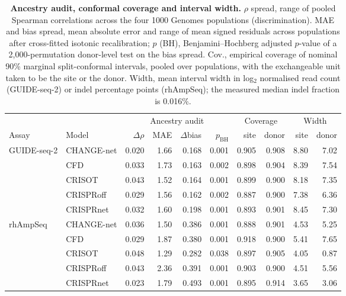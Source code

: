 \begin{table}[htbp]
\centering
\caption{\textbf{Ancestry audit, conformal coverage and interval width.} $\rho$ spread, range of pooled Spearman correlations across the four 1000 Genomes populations (discrimination). MAE and bias spread, mean absolute error and range of mean signed residuals across populations after cross-fitted isotonic recalibration; $p$ (BH), Benjamini--Hochberg adjusted $p$-value of a 2{,}000-permutation donor-level test on the bias spread. Cov., empirical coverage of nominal 90\% marginal split-conformal intervals, pooled over populations, with the exchangeable unit taken to be the site or the donor. Width, mean interval width in log$_2$ normalised read count (GUIDE-seq-2) or indel percentage points (rhAmpSeq); the measured median indel fraction is 0.016\%.}\label{tab2}
\footnotesize
\setlength{\tabcolsep}{4pt}
\begin{tabular}{@{}llrrrrrrrr@{}}
\toprule
 &  & \multicolumn{4}{c}{Ancestry audit} & \multicolumn{2}{c}{Coverage} & \multicolumn{2}{c}{Width} \\
\cmidrule(lr){3-6}\cmidrule(lr){7-8}\cmidrule(lr){9-10}
Assay & Model & $\Delta\rho$ & MAE & $\Delta$bias & $p_{\mathrm{BH}}$ & site & donor & site & donor \\
\midrule
GUIDE-seq-2 & CHANGE-net & 0.020 & 1.66 & 0.168 & 0.001 & 0.905 & 0.908 & 8.80 & 7.02 \\
 & CFD & 0.033 & 1.73 & 0.163 & 0.002 & 0.898 & 0.904 & 8.39 & 7.54 \\
 & CRISOT & 0.043 & 1.52 & 0.164 & 0.001 & 0.899 & 0.900 & 8.18 & 7.35 \\
 & CRISPRoff & 0.029 & 1.56 & 0.162 & 0.002 & 0.887 & 0.900 & 7.38 & 6.36 \\
 & CRISPRnet & 0.032 & 1.60 & 0.198 & 0.001 & 0.893 & 0.901 & 8.45 & 7.30 \\
\midrule
rhAmpSeq & CHANGE-net & 0.036 & 1.50 & 0.386 & 0.001 & 0.888 & 0.901 & 4.53 & 5.25 \\
 & CFD & 0.029 & 1.87 & 0.380 & 0.001 & 0.918 & 0.900 & 5.41 & 7.65 \\
 & CRISOT & 0.048 & 1.29 & 0.282 & 0.038 & 0.897 & 0.905 & 4.05 & 0.87 \\
 & CRISPRoff & 0.043 & 2.36 & 0.391 & 0.001 & 0.903 & 0.900 & 4.51 & 5.56 \\
 & CRISPRnet & 0.023 & 1.79 & 0.493 & 0.001 & 0.895 & 0.914 & 3.65 & 3.06 \\
\bottomrule
\end{tabular}
\end{table}

